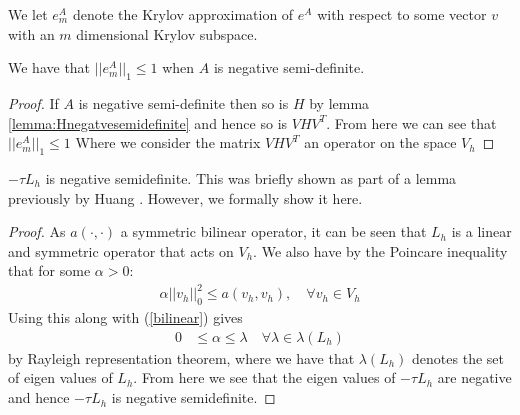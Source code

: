 \begin{definition}
    We let $e_m^A$ denote the Krylov approximation of $e^A$ with respect to some vector $v$ with an $m$ dimensional Krylov subspace.
\end{definition}

\begin{lemma} \label{lemma:leqm}
    We have that $||e_m^A||_1 \leq 1$ when $A$ is negative semi-definite.
\end{lemma}
\begin{proof}
    If $A$ is negative semi-definite then so is $H$ by lemma \ref{lemma:Hnegatvesemidefinite} and hence so is $VHV^T$.
    From here we can see that $||e_m^A||_1 \leq 1$
    Where we consider the matrix $VHV^T$ an operator on the space $V_h$
\end{proof}

\begin{lemma} \label{lemma:LHnegativeSD}
    $-\tau L_h$ is negative semidefinite. 
    This was briefly shown as part of a lemma previously by Huang \cite{Huang2022}. However, we formally show it here.
\end{lemma}    
\begin{proof}
    As $a(\cdot,\cdot)$ a symmetric bilinear operator, it can be seen that $L_h$ is a linear and symmetric operator that acts on $V_h$.
    We also have by the Poincare inequality that for some $\alpha > 0$:
    \begin{align*}
        \alpha ||v_h||^2_0 \leq a(v_h, v_h), \quad \forall v_h \in V_h
    \end{align*}
    Using this along with (\ref{bilinear}) gives
    \begin{align*}
        0 &\leq \alpha \leq \lambda \quad \forall \lambda \in \lambda(L_h)
    \end{align*} %
    by Rayleigh representation theorem, where we have that $\lambda(L_h)$ denotes the set of eigen values of $L_h$.
    From here we see that the eigen values of $-\tau L_h$ are negative and hence $-\tau L_h$ is negative semidefinite.
\end{proof}

